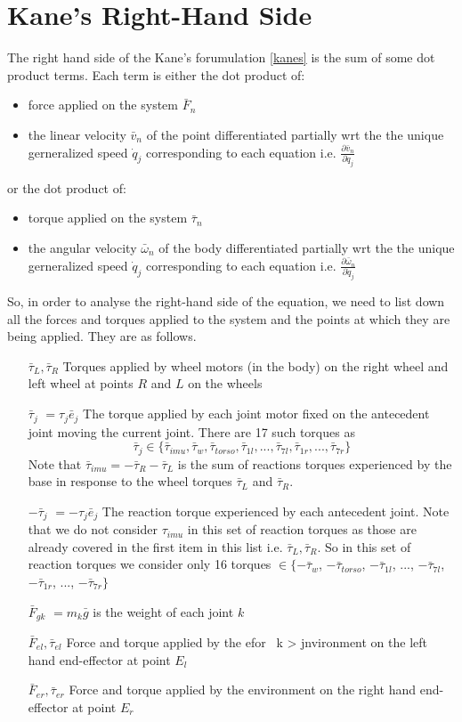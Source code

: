 \documentclass[a4paper,10pt]{article}
\begin{document}
\section{Kane's Right-Hand Side}
The right hand side of the Kane's forumulation \ref{kanes} is the sum of some dot product terms. Each term is either the
dot product of:
\begin{itemize}
 \item force applied on the system $\bar{F}_n$
 \item the linear velocity $\bar{v}_n$ of the point differentiated partially wrt the the unique gerneralized speed 
 $\dot{q}_j$ corresponding to each equation i.e. $\frac{\partial \bar{v}_n}{\partial \dot{q}_j}$\\
\end{itemize}
or the dot product of:
\begin{itemize}
 \item torque applied on the system $\bar{\tau}_n$
 \item the angular velocity $\bar{\omega}_n$ of the body differentiated partially wrt the the unique gerneralized speed 
 $\dot{q}_j$ corresponding to each equation i.e. $\frac{\partial \bar{\omega}_n}{\partial \dot{q}_j}$
\end{itemize}

So, in order to analyse the right-hand side of the equation, we need to list down all the forces and torques applied
to the system and the points at which they are being applied. They are as follows. 
\begin{itemize}[label={}]
 \item[$\bar\tau_L, \bar\tau_R $] Torques applied by wheel motors (in the body) on the right wheel and left wheel at points 
 $R$ and $L$ on the wheels
 \item[$\bar\tau_j$] $=\tau_j\bar{e}_j$ The torque applied by each joint motor fixed on the antecedent joint moving the current joint. There
 are 17 such torques as \[ \bar\tau_j \in \{ \bar\tau_{imu}, \bar\tau_{w}, \bar\tau_{torso}, \bar\tau_{1l}, ... , \bar\tau_{7l}, \bar\tau_{1r}, ... , \bar\tau_{7r} \} \]
 Note that $\bar\tau_{imu} = -\bar\tau_R-\bar\tau_L$ is the sum of reactions torques experienced by the base in response to the wheel torques $\bar\tau_L$ and $\bar\tau_R $.
 \item[$-\bar\tau_j$] $=-\tau_j\bar{e}_j$ The reaction torque experienced by each antecedent joint. Note that we do not consider 
 $\tau_{imu}$ in this set of reaction torques as those are already covered in the first item in this list i.e. $\bar\tau_L, \bar\tau_R $.
 So in this set of reaction torques we consider only 16 torques $\in \{ -\bar\tau_{w}$, $ -\bar\tau_{torso}$, $ -\bar\tau_{1l}$, $ ... $, $ -\bar\tau_{7l}$, $ -\bar\tau_{1r}$, $ ... $, $ -\bar\tau_{7r} \}$
 \item[$\bar{F}_{gk}$] $=m_k\bar{g}$ is the weight of each joint $k$
 \item[$\bar{F}_{el}, \bar{\tau}_{el}$] Force and torque applied by the e\mbox{for } k > jnvironment on the left hand end-effector at point $E_l$
 \item[$\bar{F}_{er}, \bar{\tau}_{er}$] Force and torque applied by the environment on the right hand end-effector at point $E_r$
\end{itemize}
\end{document}
